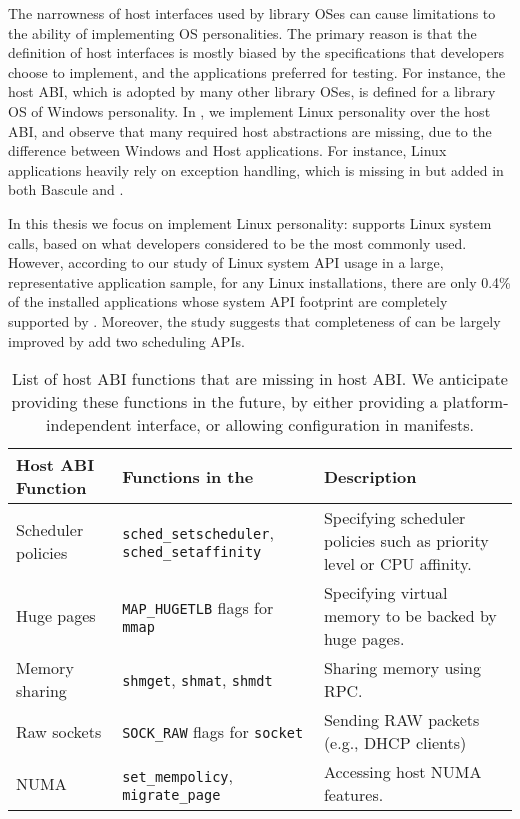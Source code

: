 The narrowness of host interfaces used by library OSes can cause limitations to the ability of implementing OS personalities.
The primary reason is that the definition of host interfaces
is mostly biased by the specifications that developers choose to implement,
and the applications preferred for testing.
For instance, the \drawbridge{} host ABI, which is adopted by many other library OSes,
is defined for a library OS of Windows personality.
In \graphene{}, we implement Linux personality over the \drawbridge{} host ABI,
and observe that many required host abstractions are missing,
due to the difference between Windows and Host applications.
For instance, Linux applications heavily rely on exception handling, which is missing in \drawbridge{} but added in both Bascule and \graphene{}.

In this thesis we focus on implement Linux personality:
\graphene{} supports \syscalls{} Linux system calls,
based on what developers considered to be the most commonly used.
However, according to our study of Linux system API usage in a large, representative application sample,
for any Linux installations,
there are only 0.4\% of the installed applications whose system API footprint
are completely supported by \graphene{}.
Moreover, the study suggests that completeness of \graphene{} can be largely improved by add two scheduling APIs.


\begin{table}[t]
\footnotesize
\centering
\begin{tabular}{|p{1.2in}|p{2.4in}|p{2.4in}|}
\hline
{\bf Host ABI Function} & {\bf Functions in the \libos{}} & {\bf Description} \\
\hline
Scheduler policies & {\tt sched\_setscheduler}, {\tt sched\_setaffinity} & Specifying scheduler policies such as priority level or CPU affinity.\\
\hline
Huge pages & {\tt MAP\_HUGETLB} flags for {\tt mmap} & Specifying virtual memory to be backed by huge pages. \\
\hline
Memory sharing & {\tt shmget}, {\tt shmat}, {\tt shmdt} & Sharing memory using RPC. \\
\hline
Raw sockets & {\tt SOCK\_RAW} flags for {\tt socket} & Sending RAW packets (e.g., DHCP clients) \\
\hline
NUMA & {\tt set\_mempolicy}, {\tt migrate\_page} & Accessing host NUMA features. \\
\hline
\end{tabular}
\caption[List of host ABI functions to be added in \graphene{} as future works]
{List of host ABI functions that are missing in \graphene{} host ABI.
We anticipate providing these functions in the future,
by either providing a platform-independent interface,
or allowing configuration in manifests.}
\label{tab:future:abi}
\end{table}


